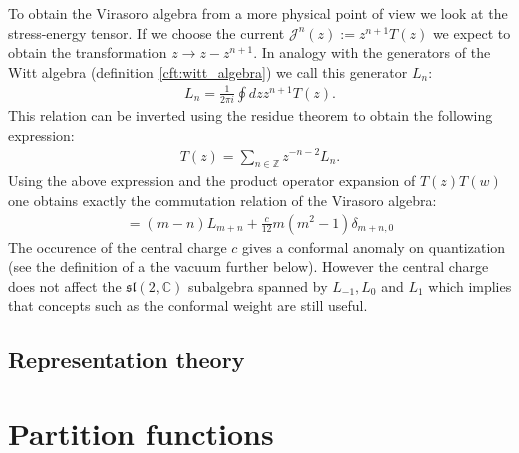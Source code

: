 	To obtain the Virasoro algebra from a more physical point of view we look at the stress-energy tensor. If we choose the current $\mathcal{J}^n(z) := z^{n+1}T(z)$ we expect to obtain the transformation $z\longrightarrow z-z^{n+1}$. In analogy with the generators of the Witt algebra (definition \ref{cft:witt_algebra}) we call this generator $L_n$:
	\begin{gather}
		L_n = \frac{1}{2\pi i}\oint dzz^{n+1}T(z).
	\end{gather}
	 This relation can be inverted using the residue theorem to obtain the following expression:
	\begin{gather}
		T(z) = \sum_{n\in\mathbb{Z}}z^{-n-2}L_n.
	\end{gather}
	Using the above expression and the product operator expansion of $T(z)T(w)$ one obtains exactly the commutation relation of the Virasoro algebra:
	\begin{gather}
		[L_m, L_n] = (m-n)L_{m+n} + \frac{c}{12}m(m^2-1)\delta_{m+n, 0}
	\end{gather}
	The occurence of the central charge $c$ gives a conformal anomaly on quantization (see the definition of a the vacuum further below). However the central charge does not affect the $\mathfrak{sl}(2, \mathbb{C})$ subalgebra spanned by $L_{-1}, L_0$ and $L_1$ which implies that concepts such as the conformal weight are still useful.

\subsection{Representation theory}




\section{Partition functions}

